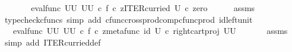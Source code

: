 \begin{isabellebody}
\ \ \isamarkupfalse%
\ \isamarkupfalse%
\ {\isachardoublequoteopen}{\isachardot}{\kern0pt}{\isachardot}{\kern0pt}{\isachardot}{\kern0pt}\ {\isacharequal}{\kern0pt}\ {\isacharparenleft}{\kern0pt}eval{\isacharunderscore}{\kern0pt}func\ {\isacharparenleft}{\kern0pt}U\isactrlbsup U\isactrlesup {\isacharparenright}{\kern0pt}\ {\isacharparenleft}{\kern0pt}U\isactrlbsup U\isactrlesup {\isacharparenright}{\kern0pt}{\isacharparenright}{\kern0pt}\ {\isasymcirc}\isactrlsub c\ {\isasymlangle}f\ {\isasymcirc}\isactrlsub c\ z{\isacharcomma}{\kern0pt}ITER{\isacharunderscore}{\kern0pt}curried\ U\ {\isasymcirc}\isactrlsub c\ zero{\isasymrangle}{\isachardoublequoteclose}\isanewline
\ \ \ \ \isamarkupfalse%
\ assms\ \isamarkupfalse%
\ {\isacharparenleft}{\kern0pt}typecheck{\isacharunderscore}{\kern0pt}cfuncs{\isacharcomma}{\kern0pt}\ simp\ add{\isacharcolon}{\kern0pt}\ cfunc{\isacharunderscore}{\kern0pt}cross{\isacharunderscore}{\kern0pt}prod{\isacharunderscore}{\kern0pt}comp{\isacharunderscore}{\kern0pt}cfunc{\isacharunderscore}{\kern0pt}prod\ id{\isacharunderscore}{\kern0pt}left{\isacharunderscore}{\kern0pt}unit{}{\isacharparenright}{\kern0pt}\isanewline
\ \ \isamarkupfalse%
\ \isamarkupfalse%
\ {\isachardoublequoteopen}{\isachardot}{\kern0pt}{\isachardot}{\kern0pt}{\isachardot}{\kern0pt}\ {\isacharequal}{\kern0pt}\ {\isacharparenleft}{\kern0pt}eval{\isacharunderscore}{\kern0pt}func\ {\isacharparenleft}{\kern0pt}U\isactrlbsup U\isactrlesup {\isacharparenright}{\kern0pt}\ {\isacharparenleft}{\kern0pt}U\isactrlbsup U\isactrlesup {\isacharparenright}{\kern0pt}{\isacharparenright}{\kern0pt}\ {\isasymcirc}\isactrlsub c\ {\isasymlangle}f\ {\isasymcirc}\isactrlsub c\ z{\isacharcomma}{\kern0pt}{\isacharparenleft}{\kern0pt}metafunc\ {\isacharparenleft}{\kern0pt}id\ U{\isacharparenright}{\kern0pt}\ {\isasymcirc}\isactrlsub c\ {\isacharparenleft}{\kern0pt}right{\isacharunderscore}{\kern0pt}cart{\isacharunderscore}{\kern0pt}proj\ {\isacharparenleft}{\kern0pt}U\isactrlbsup U\isactrlesup {\isacharparenright}{\kern0pt}\ {\isasymone}{\isacharparenright}{\kern0pt}{\isacharparenright}{\kern0pt}\isactrlsup {\isasymsharp}{\isasymrangle}{\isachardoublequoteclose}\isanewline
\ \ \ \ \isamarkupfalse%
\ assms\ \isamarkupfalse%
\ {\isacharparenleft}{\kern0pt}simp\ add{\isacharcolon}{\kern0pt}\ ITER{\isacharunderscore}{\kern0pt}curried{\isacharunderscore}{\kern0pt}def{}{\isacharparenright}{\kern0pt}\ \ \ \isanewline
\ \ \isamarkupfalse%

\end{isabellebody}

